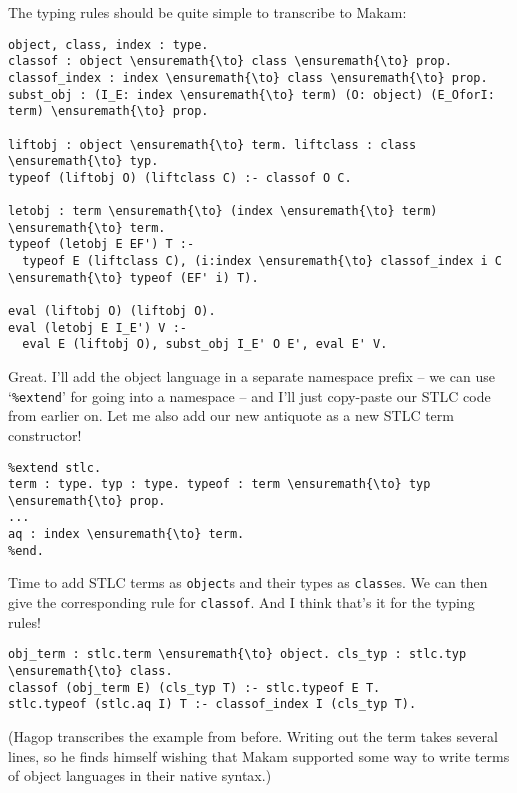 The typing rules should be quite simple to transcribe to Makam:

\begin{verbatim}
object, class, index : type.
classof : object \ensuremath{\to} class \ensuremath{\to} prop.
classof_index : index \ensuremath{\to} class \ensuremath{\to} prop.
subst_obj : (I_E: index \ensuremath{\to} term) (O: object) (E_OforI: term) \ensuremath{\to} prop.

liftobj : object \ensuremath{\to} term. liftclass : class \ensuremath{\to} typ.
typeof (liftobj O) (liftclass C) :- classof O C.

letobj : term \ensuremath{\to} (index \ensuremath{\to} term) \ensuremath{\to} term.
typeof (letobj E EF') T :-
  typeof E (liftclass C), (i:index \ensuremath{\to} classof_index i C \ensuremath{\to} typeof (EF' i) T).

eval (liftobj O) (liftobj O).
eval (letobj E I_E') V :-
  eval E (liftobj O), subst_obj I_E' O E', eval E' V.
\end{verbatim}

\heroADVISOR{} Great. I'll add the object language in a separate namespace
prefix -- we can use `\texttt{\%extend}' for going into a namespace --
and I'll just copy-paste our STLC code from earlier on. Let me also add
our new antiquote as a new STLC term constructor!

\begin{verbatim}
%extend stlc.
term : type. typ : type. typeof : term \ensuremath{\to} typ \ensuremath{\to} prop.
...
aq : index \ensuremath{\to} term.
%end.
\end{verbatim}

\heroSTUDENT{} Time to add STLC terms as \texttt{object}s and their types as
\texttt{class}es. We can then give the corresponding rule for
\texttt{classof}. And I think that's it for the typing rules!

\begin{verbatim}
obj_term : stlc.term \ensuremath{\to} object. cls_typ : stlc.typ \ensuremath{\to} class.
classof (obj_term E) (cls_typ T) :- stlc.typeof E T.
stlc.typeof (stlc.aq I) T :- classof_index I (cls_typ T).
\end{verbatim}

\begin{scenecomment}
(Hagop transcribes the example from before. Writing out the term takes several lines, so he finds himself
wishing that Makam supported some way to write terms of object languages in their native syntax.)
\end{scenecomment}

